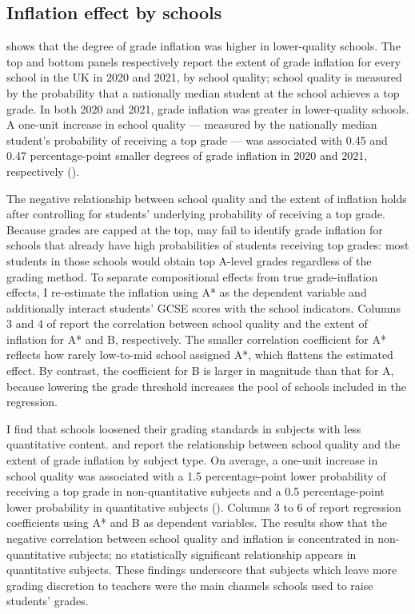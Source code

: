 
\subsection{Inflation effect by schools}

 shows that the degree of grade inflation was higher in lower-quality schools. The top and bottom panels respectively report the extent of grade inflation for every school in the UK in 2020 and 2021, by school quality; school quality is measured by the probability that a nationally median student at the school achieves a top grade. In both 2020 and 2021, grade inflation was greater in lower-quality schools. A one-unit increase in school quality — measured by the nationally median student’s probability of receiving a top grade — was associated with 0.45 and 0.47 percentage-point smaller degrees of grade inflation in 2020 and 2021, respectively ().

The negative relationship between school quality and the extent of inflation holds after controlling for students’ underlying probability of receiving a top grade. Because grades are capped at the top,  may fail to identify grade inflation for schools that already have high probabilities of students receiving top grades: most students in those schools would obtain top A-level grades regardless of the grading method. To separate compositional effects from true grade-inflation effects, I re-estimate the inflation using A* as the dependent variable and additionally interact students’ GCSE scores with the school indicators. Columns 3 and 4 of report the correlation between school quality and the extent of inflation for A* and B, respectively.  The smaller correlation coefficient for A* reflects how rarely low-to-mid school assigned A*, which flattens the estimated effect. By contrast, the coefficient for B is larger in magnitude than that for A, because lowering the grade threshold increases the pool of schools included in the regression.

I find that schools loosened their grading standards in subjects with less quantitative content.  and  report the relationship between school quality and the extent of grade inflation by subject type. On average, a one-unit increase in school quality was associated with a 1.5 percentage-point lower probability of receiving a top grade in non-quantitative subjects and a 0.5 percentage-point lower probability in quantitative subjects (). Columns 3 to 6 of  report regression coefficients using A* and B as dependent variables. The results show that the negative correlation between school quality and inflation is concentrated in non-quantitative subjects; no statistically significant relationship appears in quantitative subjects. These findings underscore that subjects which leave more grading discretion to teachers were the main channels schools used to raise students' grades.

